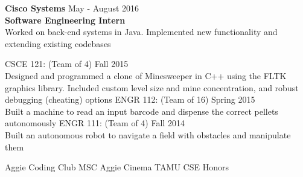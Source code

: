 \documentclass[12pt]{article}
\begin{document}
\begin{flushleft}
\begin{outline}[compactitem]
  \1 \textbf{Cisco Systems} \hfill May - August 2016
  \\ \textbf{Software Engineering Intern}
  \\ Worked on back-end systems in Java. Implemented new functionality and extending existing codebases

  \1 CSCE 121:  (Team of 4) \hfill Fall 2015 
    \\ Designed and programmed a clone of Minesweeper in C++ using the FLTK graphics library. Included custom level size and mine concentration, and robust debugging (cheating) options
  \1 ENGR 112: (Team of 16) \hfill Spring 2015
    \\ Built a machine to read an input barcode and dispense the correct pellets autonomously 
  \1 ENGR 111: (Team of 4) \hfill Fall 2014
    \\ Built an autonomous robot to navigate a field with obstacles and manipulate them

  \1 
    Aggie Coding Club
    \hfill{}\hspace{1px}
    MSC Aggie Cinema
    \hfill{}\hspace{1px}
    TAMU CSE Honors


\end{outline}
\end{flushleft}
\end{document}

